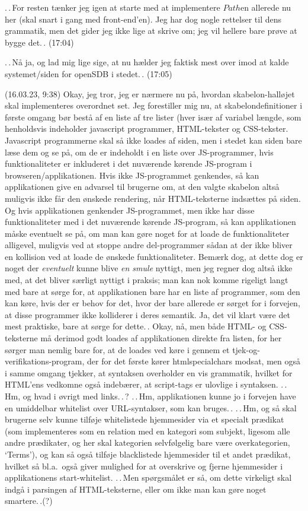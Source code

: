 \documentclass{report}
\begin{document}
.\,.\,For resten tænker jeg igen at starte med at implementere $Path$en allerede nu her (skal snart i gang med front-end'en). Jeg har dog nogle rettelser til dens grammatik, men det gider jeg ikke lige at skrive om; jeg vil hellere bare prøve at bygge det.\,. (17:04)

.\,.\,Nå ja, og lad mig lige sige, at nu hælder jeg faktisk mest over imod at kalde systemet/siden for openSDB i stedet.\,. (17:05)


(16.03.23, 9:38) Okay, jeg tror, jeg er nærmere nu på, hvordan skabelon-halløjet skal implementeres overordnet set. Jeg forestiller mig nu, at skabelondefinitioner i første omgang bør bestå af en liste af tre lister (hver især af variabel længde, som henholdsvis indeholder javascript programmer, HTML-tekster og CSS-tekster. Javascript programmerne skal så ikke loades af siden, men i stedet kan siden bare læse dem og se på, om de er indeholdt i en liste over JS-programmer, hvis funktionaliteter er inkluderet i det nuværende kørende JS-program i browseren/applikationen. Hvis ikke JS-programmet genkendes, så kan applikationen give en advarsel til brugerne om, at den valgte skabelon altså muligvis ikke får den ønskede rendering, når HTML-teksterne indsættes på siden. Og hvis applikationen genkender JS-programmet, men ikke har disse funktionaliteter med i det nuværende kørende JS-program, så kan applikationen måske eventuelt se på, om man kan gøre noget for at loade de funktionaliteter alligevel, muligvis ved at stoppe andre del-programmer sådan at der ikke bliver en kollision ved at loade de ønskede funktionaliteter. Bemærk dog, at dette dog er noget der \emph{eventuelt} kunne blive \emph{en smule} nyttigt, men jeg regner dog altså ikke med, at det bliver særligt nyttigt i praksis; man kan nok komme rigeligt langt med bare at sørge for, at applikationen bare har en liste af programmer, som den kan køre, hvis der er behov for det, hvor der bare allerede er sørget for i forvejen, at disse programmer ikke kolliderer i deres semantik. Ja, det vil klart være det mest praktiske, bare at sørge for dette.\,. Okay, nå, men både HTML- og CSS-teksterne må derimod godt loades af applikationen direkte fra listen, for her sørger man nemlig bare for, at de loades ved køre i gennem et tjek-og-verifikations-program, der for det første kører htmlspecialchars modsat, men også i samme omgang tjekker, at syntaksen overholder en vis grammatik, hvilket for HTML'ens vedkomne også indebærer, at script-tags er ulovlige i syntaksen. .\,.\,Hm, og hvad i øvrigt med links.\,.\,? .\,.\,Hm, applikationen kunne jo i forvejen have en umiddelbar whitelist over URL-syntakser, som kan bruges.\,. .\,.\,Hm, og så skal brugerne selv kunne tilføje whitelistede hjemmesider via et specialt prædikat (som implementeres som en relation med en kategori som subjekt, ligesom alle andre prædikater, og her skal kategorien selvfølgelig bare være overkategorien, `Terms'), og kan så også tilføje blacklistede hjemmesider til et andet prædikat, hvilket så bl.a.\ også giver mulighed for at overskrive og fjerne hjemmesider i applikationens start-whitelist. .\,.\,Men spørgsmålet er så, om dette virkeligt skal indgå i parsingen af HTML-teksterne, eller om ikke man kan gøre noget smartere.\,.(?)
\end{document}
